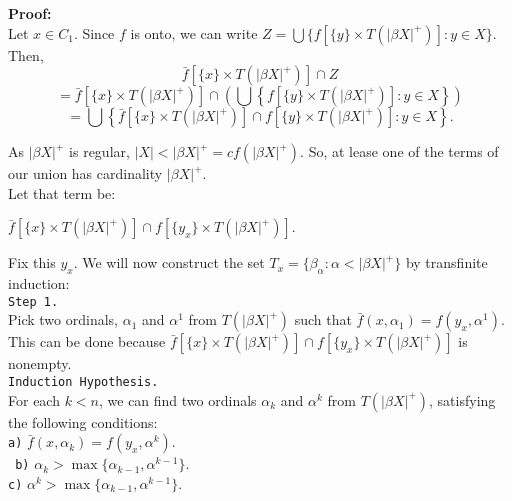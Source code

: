 \documentclass{article}
\begin{document}
																					      \vskip 20pt

																					      \textbf{Proof:} \\
																						  Let $x\in C_1$. Since $f$ is onto, we can write $Z=\bigcup \{f[\{y\}\times T(|\beta X|^+)]: y\in X\}$. Then,  $$\bar{f}[\{x\}\times T(|\beta X|^+)] \cap Z$$
																						  $$=\bar{f}\left[\{x\}\times T(|\beta X|^+)\right] \cap \left(\bigcup \left\{f[\{y\}\times T(|\beta X|^+)]: y\in X\right\}\right)$$
																						  $$=\bigcup \left\{\bar{f}\left[\{x\}\times T(|\beta X|^+)\right] \cap f\left[\{y\}\times T(|\beta X|^+)\right]: y\in X \right\}.$$

																						  \vskip 5pt

																						  As $|\beta X|^+$ is regular, $|X|<|\beta X|^+=cf(|\beta X|^+).$ So, at lease one of the terms of our union has cardinality $|\beta X|^+$. \\
																												Let that term be:
																												\begin{center}
																												$ \bar{f}\left[\{x\}\times T(|\beta X|^+)\right] \cap f\left[\{y_x\} \times T(|\beta X |^+)\right]$.
																												\end{center}
																												Fix this $y_x$. We will now construct the set $T_x=\{\beta_\alpha: \alpha < |\beta X|^+\}$ by transfinite induction:\\

																												\texttt{Step 1.}\\ Pick two ordinals, $\alpha_1$ and $ \alpha^1$ from $T(|\beta X|^+)$ such that $\bar{f}(x,\alpha_1)=f(y_x, \alpha^1)$. This can be done because $\bar{f}[\{x\}\times T(|\beta X|^+)] \cap f[\{y_x\} \times T(|\beta X |^+)]$ is nonempty.\\

																												\texttt{Induction Hypothesis.}\\ For each $k<n$, we can find two ordinals $\alpha_k$ and $\alpha^k$ from $T(|\beta X|^+)$,  satisfying the following conditions: \\
																												    \texttt{a)} $\bar{f}(x,\alpha_k)=f(y_x,\alpha^k)$.	\\	
																												    \texttt{	b)} $\alpha_k> \max\{\alpha_{k-1}, \alpha^{k-1}\}$.\\	
																												    \texttt{c)} $\alpha^k> \max\{\alpha_{k-1}, \alpha^{k-1}\}$.\\
\end{document}
